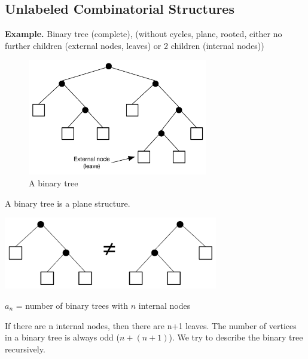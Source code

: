 \subsection{Unlabeled Combinatorial Structures}

\textbf{Example.}
Binary tree (complete), (without cycles, plane, rooted, either no further children (external nodes, leaves) or 2 children (internal nodes))

\begin{figure}[htbp]
  \centering
    \includegraphics[width=0.7\textwidth]
      {02_higher_combinatorics/pics/BinaryTree}
  \caption{A binary tree}
\end{figure}

A binary tree is a plane structure.

\begin{center}
  \includegraphics[width=0.7\textwidth]
    {02_higher_combinatorics/pics/BinaryTreeUnequal}
\end{center}

$a_n$ = number of binary trees with $n$ internal nodes

If there are n internal nodes, then there are n+1 leaves. The number of vertices in a binary tree is always odd ($n + (n+1)$). We try to describe the binary tree recursively.

